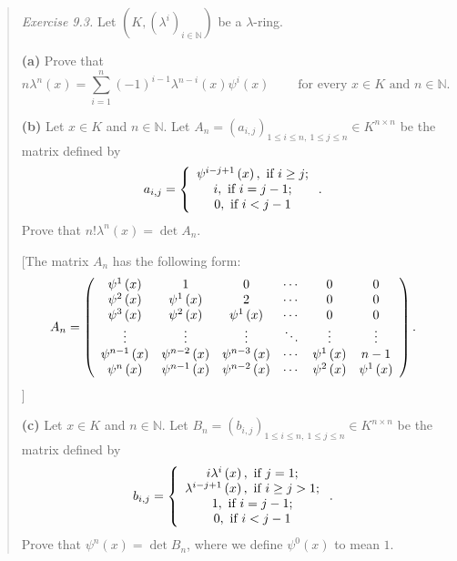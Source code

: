 \documentclass[numbers=enddot,12pt,final,onecolumn,notitlepage]{scrartcl}%
\begin{document}
\begin{quotation}
\textit{Exercise 9.3.} Let $\left(  K,\left(  \lambda^{i}\right)
_{i\in\mathbb{N}}\right)  $ be a $\lambda$-ring.

\textbf{(a)} Prove that%
\[
n\lambda^{n}\left(  x\right)  =\sum_{i=1}^{n}\left(  -1\right)  ^{i-1}%
\lambda^{n-i}\left(  x\right)  \psi^{i}\left(  x\right)
\ \ \ \ \ \ \ \ \ \ \text{for every }x\in K\text{ and }n\in\mathbb{N}\text{.}%
\]


\textbf{(b)} Let $x\in K$ and $n\in\mathbb{N}$. Let $A_{n}=\left(
a_{i,j}\right)  _{1\leq i\leq n,\ 1\leq j\leq n}\in K^{n\times n}$ be the
matrix defined by%
\[
a_{i,j}=\left\{
\begin{array}
[c]{c}%
\psi^{i-j+1}\left(  x\right)  ,\text{ if }i\geq j;\\
i,\text{ if }i=j-1;\\
0,\text{ if }i<j-1
\end{array}
\right.  .
\]
Prove that $n!\lambda^{n}\left(  x\right)  =\det A_{n}$.

[The matrix $A_{n}$ has the following form:%
\[
A_{n}=\left(
\begin{array}
[c]{cccccc}%
\psi^{1}\left(  x\right)  & 1 & 0 & \cdots & 0 & 0\\
\psi^{2}\left(  x\right)  & \psi^{1}\left(  x\right)  & 2 & \cdots & 0 & 0\\
\psi^{3}\left(  x\right)  & \psi^{2}\left(  x\right)  & \psi^{1}\left(
x\right)  & \cdots & 0 & 0\\
\vdots & \vdots & \vdots & \ddots & \vdots & \vdots\\
\psi^{n-1}\left(  x\right)  & \psi^{n-2}\left(  x\right)  & \psi^{n-3}\left(
x\right)  & \cdots & \psi^{1}\left(  x\right)  & n-1\\
\psi^{n}\left(  x\right)  & \psi^{n-1}\left(  x\right)  & \psi^{n-2}\left(
x\right)  & \cdots & \psi^{2}\left(  x\right)  & \psi^{1}\left(  x\right)
\end{array}
\right)  .
\]
]

\textbf{(c)} Let $x\in K$ and $n\in\mathbb{N}$. Let $B_{n}=\left(
b_{i,j}\right)  _{1\leq i\leq n,\ 1\leq j\leq n}\in K^{n\times n}$ be the
matrix defined by%
\[
b_{i,j}=\left\{
\begin{array}
[c]{c}%
i\lambda^{i}\left(  x\right)  ,\text{ if }j=1;\\
\lambda^{i-j+1}\left(  x\right)  ,\text{ if }i\geq j>1;\\
1,\text{ if }i=j-1;\\
0,\text{ if }i<j-1
\end{array}
\right.  .
\]
Prove that $\psi^{n}\left(  x\right)  =\det B_{n}$, where we define $\psi
^{0}\left(  x\right)  $ to mean $1$.


\end{quotation}
\end{document}
